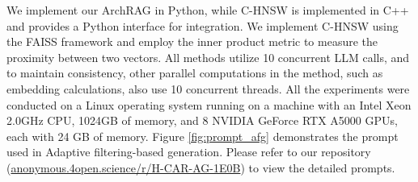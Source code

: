 % 
We implement our ArchRAG in Python, while C-HNSW is implemented in C++ and provides a Python interface for integration.
% 
We implement C-HNSW using the FAISS framework and employ the inner product metric to measure the proximity between two vectors. 
% 
All methods utilize 10 concurrent LLM calls, and to maintain consistency, other parallel computations in the method, such as embedding calculations, also use 10 concurrent threads. 
% 
All the experiments were conducted on a Linux operating system running on a machine with an Intel Xeon 2.0GHz CPU, 1024GB of memory, and 8 NVIDIA GeForce RTX A5000 GPUs, each with 24 GB of memory.
% 
Figure \ref{fig:prompt_afg} demonstrates the prompt used in Adaptive filtering-based generation.
% 
Please refer to our repository (\href{https://anonymous.4open.science/r/H-CAR-AG-1E0B}{anonymous.4open.science/r/H-CAR-AG-1E0B}) to view the detailed prompts.


